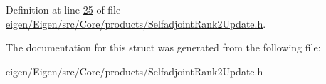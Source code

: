 Definition at line \hyperlink{eigen_2_eigen_2src_2_core_2products_2_selfadjoint_rank2_update_8h_source_l00025}{25} of file \hyperlink{eigen_2_eigen_2src_2_core_2products_2_selfadjoint_rank2_update_8h_source}{eigen/\+Eigen/src/\+Core/products/\+Selfadjoint\+Rank2\+Update.\+h}.



The documentation for this struct was generated from the following file\+:\begin{DoxyCompactItemize}
\item 
eigen/\+Eigen/src/\+Core/products/\+Selfadjoint\+Rank2\+Update.\+h\end{DoxyCompactItemize}
